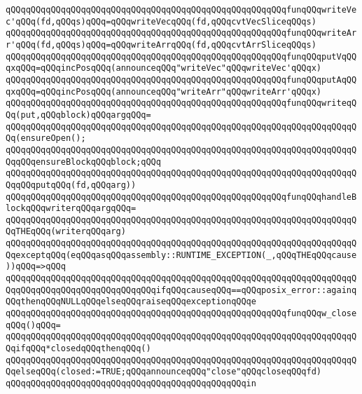 \verb|qQQqqQQqqQQqqQQqqQQqqQQqqQQqqQQqqQQqqQQqqQQqqQQqqQQqqQQqfunqQQqwriteVec'qQQq(fd,qQQqs)qQQq=qQQqwriteVecqQQq(fd,qQQqcvtVecSliceqQQqs)|\newline
\verb|qQQqqQQqqQQqqQQqqQQqqQQqqQQqqQQqqQQqqQQqqQQqqQQqqQQqqQQqfunqQQqwriteArr'qQQq(fd,qQQqs)qQQq=qQQqwriteArrqQQq(fd,qQQqcvtArrSliceqQQqs)|\newline
\verb|qQQqqQQqqQQqqQQqqQQqqQQqqQQqqQQqqQQqqQQqqQQqqQQqqQQqqQQqfunqQQqputVqQQqxqQQq=qQQqincPosqQQq(announceqQQq"writeVec"qQQqwriteVec'qQQqx)|\newline
\verb|qQQqqQQqqQQqqQQqqQQqqQQqqQQqqQQqqQQqqQQqqQQqqQQqqQQqqQQqfunqQQqputAqQQqxqQQq=qQQqincPosqQQq(announceqQQq"writeArr"qQQqwriteArr'qQQqx)|\newline
\verb|qQQqqQQqqQQqqQQqqQQqqQQqqQQqqQQqqQQqqQQqqQQqqQQqqQQqqQQqfunqQQqwriteqQQq(put,qQQqblock)qQQqargqQQq=|\newline
\verb|qQQqqQQqqQQqqQQqqQQqqQQqqQQqqQQqqQQqqQQqqQQqqQQqqQQqqQQqqQQqqQQqqQQqqQQq(ensureOpen();|\newline
\verb|qQQqqQQqqQQqqQQqqQQqqQQqqQQqqQQqqQQqqQQqqQQqqQQqqQQqqQQqqQQqqQQqqQQqqQQqqQQqensureBlockqQQqblock;qQQq|\newline
\verb|qQQqqQQqqQQqqQQqqQQqqQQqqQQqqQQqqQQqqQQqqQQqqQQqqQQqqQQqqQQqqQQqqQQqqQQqqQQqputqQQq(fd,qQQqarg))|\newline
\verb|qQQqqQQqqQQqqQQqqQQqqQQqqQQqqQQqqQQqqQQqqQQqqQQqqQQqqQQqfunqQQqhandleBlockqQQqwriterqQQqargqQQq=|\newline
\verb|qQQqqQQqqQQqqQQqqQQqqQQqqQQqqQQqqQQqqQQqqQQqqQQqqQQqqQQqqQQqqQQqqQQqqQQqTHEqQQq(writerqQQqarg)|\newline
\verb|qQQqqQQqqQQqqQQqqQQqqQQqqQQqqQQqqQQqqQQqqQQqqQQqqQQqqQQqqQQqqQQqqQQqqQQqexceptqQQq(eqQQqasqQQqassembly::RUNTIME_EXCEPTION(_,qQQqTHEqQQqcause))qQQq=>qQQq|\newline
\verb|qQQqqQQqqQQqqQQqqQQqqQQqqQQqqQQqqQQqqQQqqQQqqQQqqQQqqQQqqQQqqQQqqQQqqQQqqQQqqQQqqQQqqQQqqQQqqQQqqQQqifqQQqcauseqQQq==qQQqposix_error::againqQQqthenqQQqNULLqQQqelseqQQqraiseqQQqexceptionqQQqe|\newline
\verb|qQQqqQQqqQQqqQQqqQQqqQQqqQQqqQQqqQQqqQQqqQQqqQQqqQQqqQQqfunqQQqw_closeqQQq()qQQq=|\newline
\verb|qQQqqQQqqQQqqQQqqQQqqQQqqQQqqQQqqQQqqQQqqQQqqQQqqQQqqQQqqQQqqQQqqQQqqQQqifqQQq*closedqQQqthenqQQq()|\newline
\verb|qQQqqQQqqQQqqQQqqQQqqQQqqQQqqQQqqQQqqQQqqQQqqQQqqQQqqQQqqQQqqQQqqQQqqQQqelseqQQq(closed:=TRUE;qQQqannounceqQQq"close"qQQqcloseqQQqfd)|\newline
\verb|qQQqqQQqqQQqqQQqqQQqqQQqqQQqqQQqqQQqqQQqqQQqqQQqin|\newline
